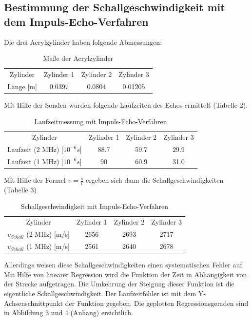 \documentclass[11pt,ngerman,a4paper]{article}
\begin{document}
\subsection{Bestimmung der Schallgeschwindigkeit mit dem Impuls-Echo-Verfahren}
Die drei Acrylzylinder haben folgende Abmessungen:
 \begin{table}[h]
\centering
 \begin{tabular}{|c||c|c|c|}
 Zylinder & Zylinder 1 & Zylinder 2 & Zylinder 3 \\
  Länge [m] & 0.0397 & 0.0804 & 0.01205 \\
 \end{tabular}
\caption{Maße der Acrylzylinder}
\end{table}
\newline Mit Hilfe der Sonden wurden folgende Laufzeiten des Echos ermittelt (Tabelle 2).
 \begin{table}[h]
\centering
 \begin{tabular}{|c||c|c|c|}
 Zylinder & Zylinder 1 & Zylinder 2 & Zylinder 3 \\
 Laufzeit (2 MHz) [$10^{-6}s$] & 88.7 & 59.7 & 29.9 \\
 Laufzeit (1 MHz) [$10^{-6}s$] & 90  & 60.9 & 31.0 \\
 \end{tabular}
\caption{Laufzeitmessung mit Impuls-Echo-Verfahren}
\end{table}
\newline
Mit Hilfe der Formel $v=\frac{s}{t}$ ergeben sich dann die Schallgeschwindigkeiten (Tabelle 3)
\begin{table}[h]
\centering
 \begin{tabular}{|c||c|c|c|}
 Zylinder & Zylinder 1 & Zylinder 2 & Zylinder 3 \\
 $v_{Schall}$ (2 MHz) [m/s] & 2656 & 2693 & 2717 \\
 $v_{Schall}$ (1 MHz) [m/s] & 2561  & 2640 & 2678 \\
 \end{tabular}
\caption{Schallgeschwindigkeit mit Impuls-Echo-Verfahren}
\end{table}
\newline
Allerdings weisen diese Schallgeschwindigkeiten einen systematischen Fehler auf. Mit Hilfe von linearer Regression wird die Funktion der Zeit in Abhängigkeit von der Strecke aufgetragen. Die Umkehrung der Steigung dieser Funktion ist die eigentliche Schallgeschwindigkeit. Der Laufzeitfehler ist mit dem Y-Achsenschnittpunkt der Funktion gegeben. Die geplotten Regressionsgeraden sind in Abbildung 3 und 4 (Anhang) ersichtlich.
\end{document}
